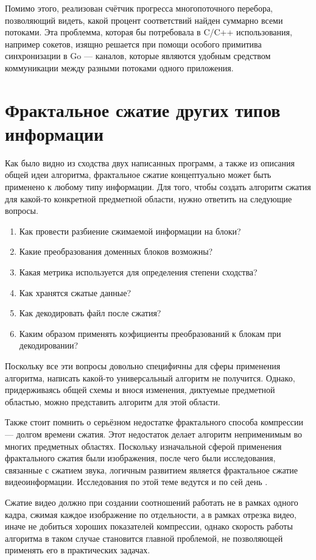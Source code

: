 \documentclass[bachelor,paper]{pmk-graduate}
\theoremstyle{definition}
\begin{document}
Помимо этого, реализован счётчик прогресса многопоточного перебора, позволяющий видеть, какой процент соответствий найден суммарно всеми потоками. Эта проблемма, которая бы потребовала в C/C++ использования, например сокетов, изящно решается при помощи особого примитива синхронизации в Go --- каналов, которые являются удобным средством коммуникации между разными потоками одного приложения.

\section{Фрактальное сжатие  других типов информации}

Как было видно из сходства двух написанных программ, а также из описания общей идеи алгоритма, фрактальное сжатие концептуально может быть применено к любому типу информации. Для того, чтобы создать алгоритм сжатия для какой-то конкретной предметной области, нужно ответить на следующие вопросы.
\begin{enumerate}
  \item Как провести разбиение сжимаемой информации на блоки?
  \item Какие преобразования доменных блоков возможны?
  \item Какая метрика используется для определения степени сходства?
  \item Как хранятся сжатые данные?
  \item Как декодировать файл после сжатия?
  \item Каким образом применять коэфициенты преобразований к блокам при декодировании?
\end{enumerate}

Поскольку все эти вопросы довольно специфичны для сферы применения алгоритма, написать какой-то универсальный алгоритм не получится. Однако, придерживаясь общей схемы и внося изменения, диктуемые предметной областью, можно представить алгоритм для этой области.

Также стоит помнить о серьёзном недостатке фрактального способа компрессии --- долгом времени сжатия. Этот недостаток делает алгоритм неприменимым во многих предметных областях. Поскольку изначальной сферой применения фрактального сжатия были изображения, после чего были исследования, связанные с сжатием звука, логичным развитием является фрактальное сжатие видеоинформации. Исследования по этой теме ведутся и по сей день \cite{fractVideo1, fractVideo2}. 

Сжатие видео должно при создании соотношений работать не в рамках одного кадра, сжимая каждое изображение по отдельности, а в рамках отрезка видео, иначе не добиться хороших показателей компрессии, однако скорость работы алгоритма в таком случае становится главной проблемой, не позволяющей применять его в практических задачах.
\end{document}
